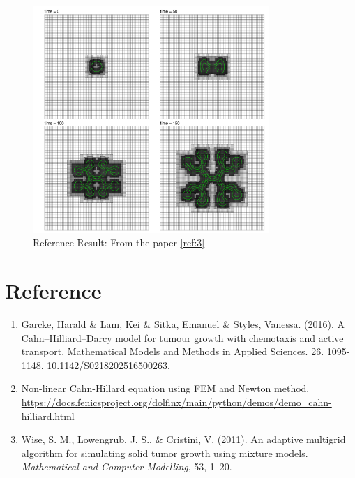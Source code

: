\documentclass[12pt]{article}
\begin{document}
\begin{figure}[h]
    \centering
    \includegraphics[width=0.8\textwidth]{figures/refRes3.png}
    \caption{Reference Result: From the paper \ref{ref:3}}
    \label{fig:refRes3}
\end{figure}

\section*{Reference}
\begin{enumerate}
    \item \label{ref:1} Garcke, Harald \& Lam, Kei \& Sitka, Emanuel \& Styles, Vanessa. (2016). A Cahn–Hilliard–Darcy model for tumour growth with chemotaxis and active transport. Mathematical Models and Methods in Applied Sciences. 26. 1095-1148. 10.1142/S0218202516500263. 
    \item Non-linear Cahn-Hillard equation using FEM and Newton method. \url{https://docs.fenicsproject.org/dolfinx/main/python/demos/demo_cahn-hilliard.html}
    \item \label{ref:3}Wise, S. M., Lowengrub, J. S., \& Cristini, V. (2011). An adaptive multigrid algorithm for simulating solid tumor growth using mixture models. \textit{Mathematical and Computer Modelling}, 53, 1–20.
\end{enumerate}
\end{document}
